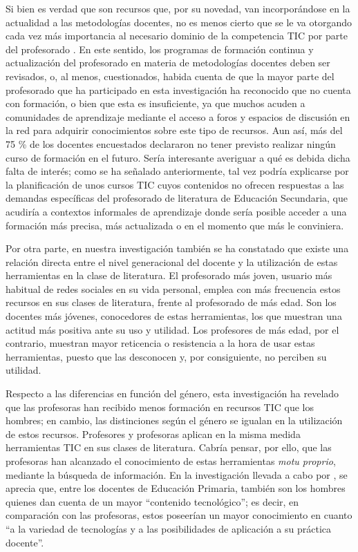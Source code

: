 \documentclass[spanish]{textolivre}
\begin{document}
Si bien es verdad que son recursos que, por su novedad, van incorporándose en la actualidad a las metodologías docentes, no es menos cierto que se le va otorgando cada vez más importancia al necesario dominio de la competencia TIC por parte del profesorado \cite{almerich_perfiles_2004, prendes-espinosa_competencias_2010, instituto_nacional_de_tecnologias_educativas_y_de_formacion_del_profesorado_intef_marco_2017}. En este sentido, los programas de formación continua y actualización del profesorado en materia de metodologías docentes deben ser revisados, o, al menos, cuestionados, habida cuenta de que la mayor parte del profesorado que ha participado en esta investigación ha reconocido que no cuenta con formación, o bien que esta es insuficiente, ya que muchos acuden a comunidades de aprendizaje mediante el acceso a foros y espacios de discusión en la red para adquirir conocimientos sobre este tipo de recursos. Aun así, más del 75 \% de los docentes encuestados declararon no tener previsto realizar ningún curso de formación en el futuro. Sería interesante averiguar a qué es debida dicha falta de interés; como se ha señalado anteriormente, tal vez podría explicarse por la planificación de unos cursos TIC cuyos contenidos no ofrecen respuestas a las demandas específicas del profesorado de literatura de Educación Secundaria, que acudiría a contextos informales de aprendizaje donde sería posible acceder a una formación más precisa, más actualizada o en el momento que más le conviniera.

Por otra parte, en nuestra investigación también se ha constatado que existe una relación directa entre el nivel generacional del docente y la utilización de estas herramientas en la clase de literatura. El profesorado más joven, usuario más habitual de redes sociales en su vida personal, emplea con más frecuencia estos recursos en sus clases de literatura, frente al profesorado de más edad. Son los docentes más jóvenes, conocedores de estas herramientas, los que muestran una actitud más positiva ante su uso y utilidad. Los profesores de más edad, por el contrario, muestran mayor reticencia o resistencia a la hora de usar estas herramientas, puesto que las desconocen y, por consiguiente, no perciben su utilidad. 

Respecto a las diferencias en función del género, esta investigación ha revelado que las profesoras han recibido menos formación en recursos TIC que los hombres; en cambio, las distinciones según el género se igualan en la utilización de estos recursos. Profesores y profesoras aplican en la misma medida herramientas TIC en sus clases de literatura. Cabría pensar, por ello, que las profesoras han alcanzado el conocimiento de estas herramientas \textit{motu proprio}, mediante la búsqueda de información. En la investigación llevada a cabo por \textcite[p. 62]{ortiz_colon_autopercepcion_2020}, se aprecia que, entre los docentes de Educación Primaria, también son los hombres quienes dan cuenta de un mayor “contenido tecnológico”; es decir, en comparación con las profesoras, estos poseerían un mayor conocimiento en cuanto “a la variedad de tecnologías y a las posibilidades de aplicación a su práctica docente”.
\end{document}
